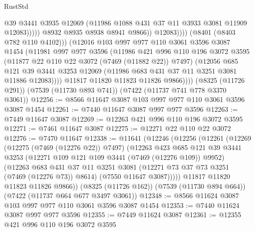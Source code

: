\begin{lexlean}{RustStd}
\begin{coremodule}
                                @39
                                @3441
                                @3935
                                @12069
                                (@11986 @1088 @431 @37 @11 @3933 @3081 @11909 @12083)))))
                        @8932
                        @8935
                        @8938
                        @8941
                        @9866))
                    @12083))))
            (@8401 (@8403 @782 @110 @4102)))
          (@12016
            @103
            @997
            @977
            @110
            @3061
            @3596
            @3087
            @1454
            (@11981
              @997
              @977
              @3596
              (@11986
                @421
                @996
                @110
                @196
                @3072
                @3595
                (@11877 @22 @110 @22 @3072 (@7469 (@11882 @22)) @7497)
                (@12056
                  @685
                  @121
                  @39
                  @3441
                  @3253
                  @12069
                  (@11986 @683 @431 @37 @11 @3251 @3081 @11886 @12083))))
            @11817
            @11820
            @11823
            @11826
            @9866))))
    (@8325 (@11726 @291))
    (@7539 (@11730 @893 @741))
    (@7422 (@11737 @741 @778 @3370 @3061))
@12256 := @8566 @11647 @3087 @103 @997 @977 @110 @3061 @3596 @3087 @1454
@12261 := @7440 @11647 @3087 @997 @977 @3596
@12263 := @7449 @11647 @3087
@12269 := @12263 @421 @996 @110 @196 @3072 @3595
@12271 := @7461 @11647 @3087
@12275 := @12271 @22 @110 @22 @3072
@12276 := @7470 @11647
@12338 := @11641
    (@12246
      (@12256
        (@12261
          (@12269
            (@12275 (@7469 (@12276 @22)) @7497)
            (@12263
              @423
              @685
              @121
              @39
              @3441
              @3253
              (@12271 @109 @121 @109 @3441 (@7469 (@12276 @109)) @9952)
              (@12263
                @683
                @431
                @37
                @11
                @3251
                @3081
                (@12271 @73 @37 @73 @3251 (@7469 (@12276 @73)) @8614)
                (@7550 @11647 @3087)))))
        @11817
        @11820
        @11823
        @11826
        @9866))
    (@8325 (@11726 @162))
    (@7539 (@11730 @894 @664))
    (@7422 (@11737 @664 @677 @3497 @3061))
@12348 := @8566 @11624 @3087 @103 @997 @977 @110 @3061 @3596 @3087 @1454
@12353 := @7440 @11624 @3087 @997 @977 @3596
@12355 := @7449 @11624 @3087
@12361 := @12355 @421 @996 @110 @196 @3072 @3595

\end{coremodule}
\end{lexlean}
